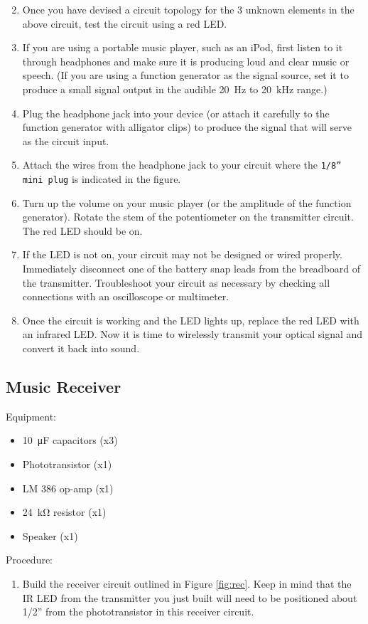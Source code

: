 \documentclass[12pt]{../manual}
\begin{document}
\begin{enumerate}
\setcounter{enumi}{1}
\item Once you have devised a circuit topology for the 3 unknown elements in the above circuit, test the circuit using a red LED.
\item If you are using a portable music player, such as an iPod, first listen to it through headphones and make sure it is producing loud and clear music or speech. (If you are using a function generator as the signal source, set it to produce a small signal output in the audible \SI{20}{\hertz} to \SI{20}{\kilo\hertz} range.)
\item Plug the headphone jack into your device (or attach it carefully to the function generator with alligator clips) to produce the signal that will serve as the circuit input.
\item Attach the wires from the headphone jack to your circuit where the {\tt 1/8'' mini plug} is indicated in the figure.
\item Turn up the volume on your music player (or the amplitude of the function generator). Rotate the stem of the potentiometer on the transmitter circuit. The red LED should be on.
\item If the LED is not on, your circuit may not be designed or wired properly. Immediately disconnect one of the battery snap leads from the breadboard of the transmitter. Troubleshoot your circuit as necessary by checking all connections with an oscilloscope or multimeter.
\item Once the circuit is working and the LED lights up, replace the red LED with an infrared LED. Now it is time to wirelessly transmit your optical signal and convert it back into sound.
\end{enumerate}

\newpage
\subsection{Music Receiver}
Equipment:
\begin{itemize}
\item \SI{10}{\micro\farad} capacitors (x3)
\item Phototransistor (x1)
\item LM 386 op-amp (x1)
\item \SI{24}{\kilo\ohm} resistor (x1)
\item Speaker (x1)
\end{itemize}

Procedure:
\begin{enumerate}
\item Build the receiver circuit outlined in Figure \ref{fig:rec}. Keep in mind that the IR LED from the transmitter you just built will need to be positioned about 1/2'' from the phototransistor in this receiver circuit. 
\end{enumerate}
\end{document}
